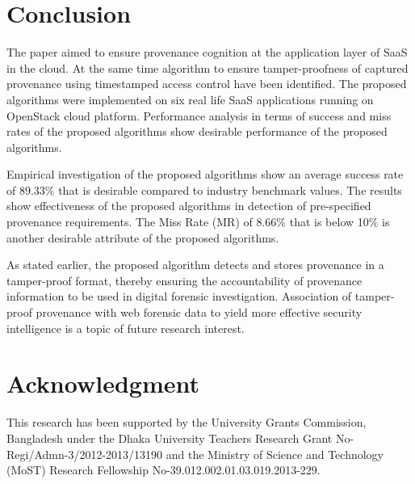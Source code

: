 \documentclass[conference]{IEEEtran}
\begin{document}
\section{Conclusion}

The paper aimed to ensure provenance cognition at the application layer of SaaS in the cloud. At the same time algorithm to ensure tamper-proofness of captured provenance using timestamped access control have been identified. The proposed algorithms were implemented on six real life SaaS applications running on OpenStack cloud platform. Performance analysis in terms of success and miss rates of the proposed algorithms show desirable performance of the proposed algorithms.

Empirical investigation of the proposed algorithms show an average success rate of 89.33\% that is desirable compared to industry benchmark values. The results show effectiveness of the proposed algorithms in detection of pre-specified provenance requirements. The Miss Rate (MR) of 8.66\% that is below 10\% is another desirable attribute of the proposed algorithms.

As stated earlier, the proposed algorithm detects and stores provenance in a tamper-proof format, thereby ensuring the accountability of provenance information to be used in digital forensic investigation. Association of tamper-proof provenance with web forensic data to yield more effective security intelligence is a topic of future research interest.


\section*{Acknowledgment}
This research has been supported by the University Grants Commission, Bangladesh under the Dhaka University Teachers Research Grant No-Regi/Admn-3/2012-2013/13190 and the Ministry of Science and Technology (MoST) Research Fellowship No-39.012.002.01.03.019.2013-229.
\end{document}
